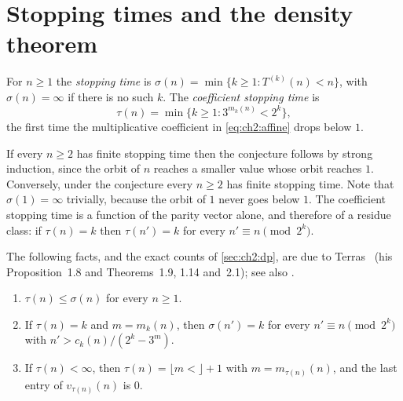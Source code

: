 \section{Stopping times and the density theorem}\label{sec:ch2:density}

\begin{definition}\label{def:ch2:stopping}
For $n\geq1$ the \emph{stopping time} is
$\sigma(n)=\min\{k\geq1:T^{(k)}(n)<n\}$, with $\sigma(n)=\infty$ if there is no
such $k$. The \emph{coefficient stopping time} is
\[
  \tau(n)=\min\{k\geq1:3^{m_k(n)}<2^k\},
\]
the first time the multiplicative coefficient in \eqref{eq:ch2:affine} drops
below $1$.
\end{definition}

If every $n\geq2$ has finite stopping time then the conjecture follows by
strong induction, since the orbit of $n$ reaches a smaller value whose orbit
reaches $1$. Conversely, under the conjecture every $n\geq2$ has finite
stopping time. Note that $\sigma(1)=\infty$ trivially, because the orbit of $1$
never goes below $1$. The coefficient stopping time is a function of the
parity vector alone, and therefore of a residue class: if $\tau(n)=k$ then
$\tau(n')=k$ for every $n'\equiv n\pmod{2^k}$.

The following facts, and the exact counts of \cref{sec:ch2:dp}, are due to Terras~\cite{terras1976} (his Proposition~1.8 and Theorems~1.9, 1.14 and~2.1); see also \cite[Theorem~C]{lagarias1985}.

\begin{proposition}\label{prop:ch2:tau}
\leavevmode
\begin{enumerate}[label=(\roman*),leftmargin=2em]
\item $\tau(n)\leq\sigma(n)$ for every $n\geq1$.
\item If $\tau(n)=k$ and $m=m_k(n)$, then $\sigma(n')=k$ for every
  $n'\equiv n\pmod{2^k}$ with $n'>c_k(n)/(2^k-3^m)$.
\item If $\tau(n)<\infty$, then $\tau(n)=\lfloor m\lt\rfloor+1$ with
  $m=m_{\tau(n)}(n)$, and the last entry of $v_{\tau(n)}(n)$ is $0$.
\end{enumerate}
\end{proposition}


